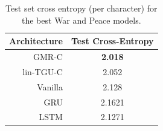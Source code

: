 \begin{table}[ht]
\centering
\begin{tabu} to \textwidth {r||c}
Architecture & Test Cross-Entropy \\
\hline
GMR-C & \textbf{2.018} \\ %
lin-TGU-C & 2.052 \\ %
\hline
Vanilla & 2.128 \\ %
GRU & 2.1621 \\ %
LSTM & 2.1271 \\%
\hline
\end{tabu}
\caption{Test set cross entropy (per character) for the best War and Peace models.}
\label{tab:wptest}
\end{table}

